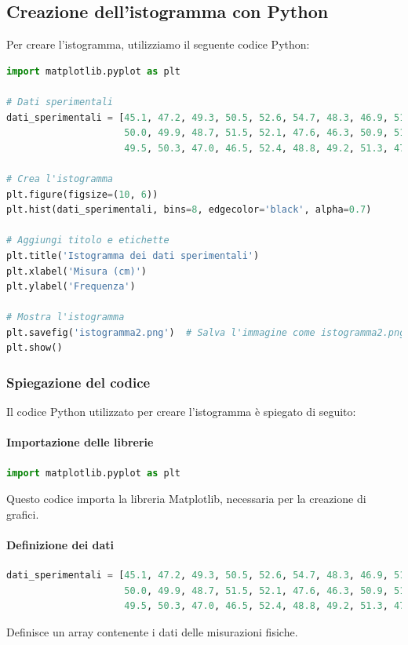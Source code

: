 \documentclass[a4paper,12pt]{article}
\begin{document}
\subsection{Creazione dell'istogramma con Python}
Per creare l'istogramma, utilizziamo il seguente codice Python:

\begin{lstlisting}[language=Python, caption=Codice Python per creare l'istogramma]
import matplotlib.pyplot as plt

# Dati sperimentali
dati_sperimentali = [45.1, 47.2, 49.3, 50.5, 52.6, 54.7, 48.3, 46.9, 51.2, 53.8, 
                     50.0, 49.9, 48.7, 51.5, 52.1, 47.6, 46.3, 50.9, 51.8, 48.0, 
                     49.5, 50.3, 47.0, 46.5, 52.4, 48.8, 49.2, 51.3, 47.8, 50.7]

# Crea l'istogramma
plt.figure(figsize=(10, 6))
plt.hist(dati_sperimentali, bins=8, edgecolor='black', alpha=0.7)

# Aggiungi titolo e etichette
plt.title('Istogramma dei dati sperimentali')
plt.xlabel('Misura (cm)')
plt.ylabel('Frequenza')

# Mostra l'istogramma
plt.savefig('istogramma2.png')  # Salva l'immagine come istogramma2.png
plt.show()
\end{lstlisting}

\subsubsection{Spiegazione del codice}
Il codice Python utilizzato per creare l'istogramma è spiegato di seguito:

\paragraph{Importazione delle librerie}
\begin{lstlisting}[language=Python, caption=Importazione delle librerie]
import matplotlib.pyplot as plt
\end{lstlisting}
Questo codice importa la libreria Matplotlib, necessaria per la creazione di grafici.

\paragraph{Definizione dei dati}
\begin{lstlisting}[language=Python, caption=Definizione dei dati]
dati_sperimentali = [45.1, 47.2, 49.3, 50.5, 52.6, 54.7, 48.3, 46.9, 51.2, 53.8, 
                     50.0, 49.9, 48.7, 51.5, 52.1, 47.6, 46.3, 50.9, 51.8, 48.0, 
                     49.5, 50.3, 47.0, 46.5, 52.4, 48.8, 49.2, 51.3, 47.8, 50.7]
\end{lstlisting}
Definisce un array contenente i dati delle misurazioni fisiche.
\end{document}
